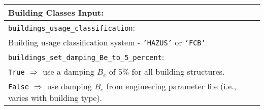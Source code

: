 \documentclass[a4paper, 12pt]{report}
\begin{document}
\vspace{2em}
\begin{tabular}{|p{\textwidth}|}
\hline
\vspace{0.3em} \noindent \Large \textbf{Building Classes Input:} \normalsize \\
\hline \vspace{0.1em} \texttt{buildings\_usage\_classification}: \\
Building usage classification system - \texttt{'HAZUS'} or \texttt{'FCB'} \\
\hline \vspace{0.1em}
\texttt{buildings\_set\_damping\_Be\_to\_5\_percent}: \\
 \hspace{0.5em} \texttt{True} $\Rightarrow$ use a damping $B_e$ of
 $5\%$ for all building structures.\\
 \hspace{0.5em} \texttt{False} $\Rightarrow$ use  damping $B_e$ from
 engineering parameter file (i.e., varies with building type).\\
\hline
 \end{tabular}
\end{document}

